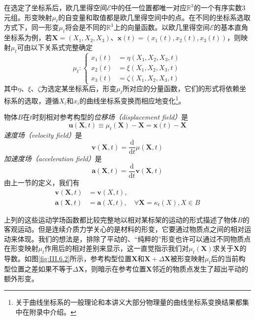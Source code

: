 \documentclass[main.tex]{subfiles}
\begin{document}
在选定了坐标系后，欧几里得空间$\mathcal{E}$中的任一位置都唯一对应$\mathbb{R}^3$的一个有序实数3元组。形变映射$\mu_t$的自变量和取值都是欧几里得空间中的点。在不同的坐标系选取方式下，同一形变$\mu_t$将会是不同的$\mathbb{R}^3$上的向量函数。以欧几里得空间$\mathcal{E}$的基本直角坐标系为例，若$\mathbf{X}=\left(X_1,X_2,X_3\right)$、$\mathbf{x}\left(t\right)=\left(x_1\left(t\right),x_2\left(t\right),x_3\left(t\right)\right)$，则映射$\mu_t$可由以下关系式完整确定
\[
    \mu_t:\left\{\begin{array}{rl}
        x_1\left(t\right) & =\eta\left(X_1,X_2,X_3,t\right)  \\
        x_2\left(t\right) & =\xi\left(X_1,X_2,X_3,t\right)   \\
        x_3\left(t\right) & =\zeta\left(X_1,X_2,X_3,t\right)\end{array}\right.
\]
其中$\eta$、$\xi$、$\zeta$为选定某坐标系后，形变$\mu_t$所对应的分量函数，它们的形式将依赖坐标系的选取，遵循$X_i$和$x_i$的曲线坐标系变换而相应地变化\footnote{关于曲线坐标系的一般理论和本讲义大部分物理量的曲线坐标系变换结果都集中在附录中介绍。}。

物体$B$在$t$时刻相对参考构型的\emph{位移场（displacement field）}是
\[\mathbf{u}\left(\mathbf{X},t\right)\equiv\mu_t\left(\mathbf{X}\right)-\mathbf{X}=\mathbf{x}\left(t\right)-\mathbf{X}\]
\emph{速度场（velocity field）}是
\[\mathbf{v}\left(\mathbf{X},t\right)=\frac{\mathrm{d}}{\mathrm{d}t}{\mu}\left(\mathbf{X},t\right)\]
\emph{加速度场（acceleration field）}是
\[\mathbf{a}\left(\mathbf{X},t\right)=\frac{\mathrm{d}}{\mathrm{d}t}\mathbf{v}\left(\mathbf{X},t\right)\]
由上一节的定义，我们有
\begin{align*}
    \mathbf{v}\left(\mathbf{X},t\right) & =\mathbf{v}\left(X,t\right),                                                     \\
    \mathbf{a}\left(\mathbf{X},t\right) & =\mathbf{a}\left(X,t\right),\quad\forall\mathbf{X}=\kappa_t\left(X\right),X\in B
\end{align*}

上列的这些运动学场函数都比较完整地以相对某标架的运动的形式描述了物体$B$的客观运动。但是连续介质力学关心的是材料的形变，它要通过物质点之间的相对运动来体现。我们的想法是，排除了平动的、“纯粹的”形变也许可以通过不同物质点在形变映射$\mu_t$作用后的相对差别来显示，这一直觉指示我们对$\mu_t\left(\mathbf{X}\right)$求关于$\mathbf{X}$的导数。如图\ref{fig:III.6.2}所示，参考构型位置$\mathbf{X}$和$\mathbf{X}+\Delta\mathbf{X}$被形变映射$\mu_t$后的当前构型位置之差如果不等于$\Delta\mathbf{X}$，则暗示在参考位置$\mathbf{X}$邻近的物质点发生了超出平动的额外形变。
\end{document}
